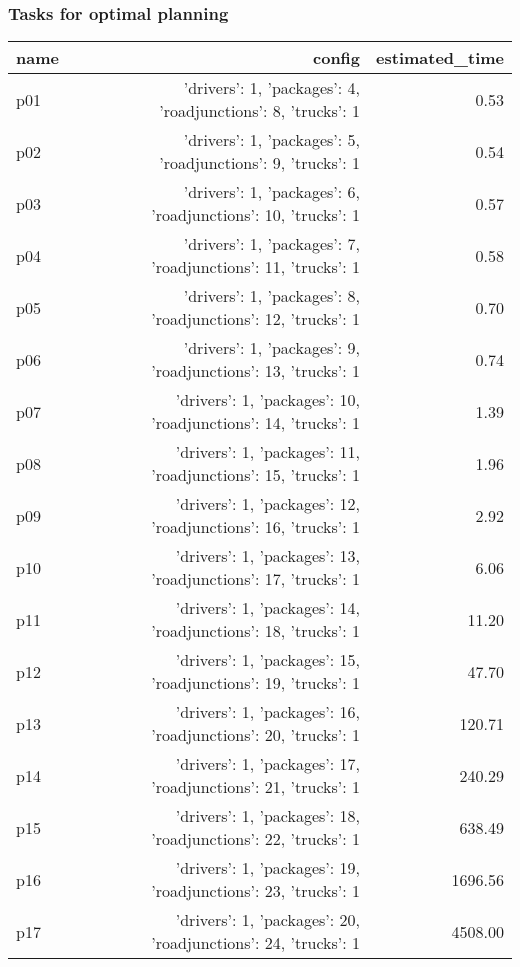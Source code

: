 \documentclass{article}
\begin{document}
                                \subsubsection*{Tasks for optimal planning}
                                
                            \begin{center}
                            \scriptsize
                            \begin{tabular}{@{}l|r|r@{}}
                            name & config & estimated\_time\\\midrule
                              p01&{'drivers': 1, 'packages': 4, 'roadjunctions': 8, 'trucks': 1}&0.53\\
  p02&{'drivers': 1, 'packages': 5, 'roadjunctions': 9, 'trucks': 1}&0.54\\
  p03&{'drivers': 1, 'packages': 6, 'roadjunctions': 10, 'trucks': 1}&0.57\\
  p04&{'drivers': 1, 'packages': 7, 'roadjunctions': 11, 'trucks': 1}&0.58\\
  p05&{'drivers': 1, 'packages': 8, 'roadjunctions': 12, 'trucks': 1}&0.70\\
  p06&{'drivers': 1, 'packages': 9, 'roadjunctions': 13, 'trucks': 1}&0.74\\
  p07&{'drivers': 1, 'packages': 10, 'roadjunctions': 14, 'trucks': 1}&1.39\\
  p08&{'drivers': 1, 'packages': 11, 'roadjunctions': 15, 'trucks': 1}&1.96\\
  p09&{'drivers': 1, 'packages': 12, 'roadjunctions': 16, 'trucks': 1}&2.92\\
  p10&{'drivers': 1, 'packages': 13, 'roadjunctions': 17, 'trucks': 1}&6.06\\
  p11&{'drivers': 1, 'packages': 14, 'roadjunctions': 18, 'trucks': 1}&11.20\\
  p12&{'drivers': 1, 'packages': 15, 'roadjunctions': 19, 'trucks': 1}&47.70\\
  p13&{'drivers': 1, 'packages': 16, 'roadjunctions': 20, 'trucks': 1}&120.71\\
  p14&{'drivers': 1, 'packages': 17, 'roadjunctions': 21, 'trucks': 1}&240.29\\
  p15&{'drivers': 1, 'packages': 18, 'roadjunctions': 22, 'trucks': 1}&638.49\\
  p16&{'drivers': 1, 'packages': 19, 'roadjunctions': 23, 'trucks': 1}&1696.56\\
  p17&{'drivers': 1, 'packages': 20, 'roadjunctions': 24, 'trucks': 1}&4508.00\\

\end{tabular}
\end{center}
\end{document}
